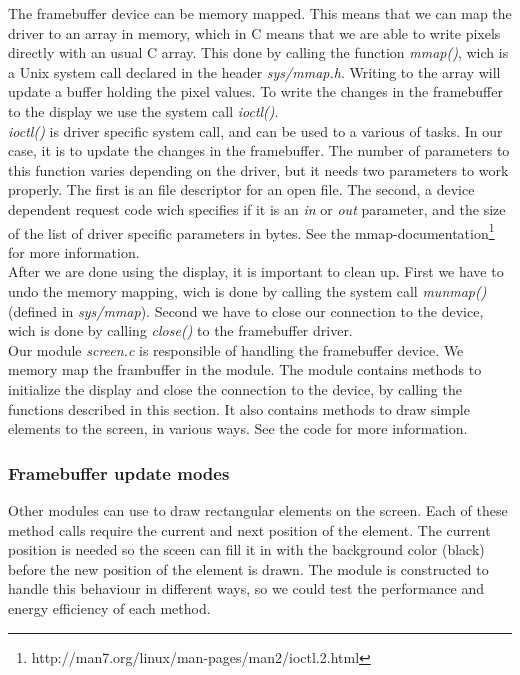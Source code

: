 The framebuffer device can be memory mapped. This means that we can map the driver to an array in memory, which in C means that we are able to write pixels directly with an usual C array. This done by calling the function \emph{mmap()}, wich is a Unix system call declared in the header \emph{sys/mmap.h}. 
Writing to the array will update a buffer holding the pixel values. To write the changes in the framebuffer to the display we use the system call \emph{ioctl()}. \\

\emph{ioctl()} is driver specific system call, and can be used to a various of tasks. In our case, it is to update the changes in the framebuffer. The number of parameters to this function varies depending on the driver, but it needs two parameters to work properly. The first is an file descriptor for an open file. The second, a device dependent request code wich specifies if it is an \emph{in} or \emph{out} parameter, and the size of the list of driver specific parameters in bytes. See the mmap-documentation\footnote{http://man7.org/linux/man-pages/man2/ioctl.2.html} for more information.   
\\

After we are done using the display, it is important to clean up. First we have to undo the memory mapping, wich is done by calling the system call \emph{munmap()} (defined in \emph{sys/mmap}). Second we have to close our connection to the device, wich is done by calling \emph{close()} to the framebuffer driver. \\

Our module \emph{screen.c} is responsible of handling the framebuffer device. We memory map the frambuffer in the module. The module contains methods to initialize the display and close the connection to the device, by calling the functions described in this section. It also contains methods to draw simple elements to the screen, in various ways. See the code for more information. 

\subsubsection{Framebuffer update modes}
\label{subsubsection:framebuffer-update-modes}
Other modules can use  to draw rectangular elements on the screen. Each of these method calls require the current and next position of the element. The current position is needed so the sceen can fill it in with the background color (black) before the new position of the element is drawn. The module is constructed to handle this behaviour in different ways, so we could test the performance and energy efficiency of each method.

